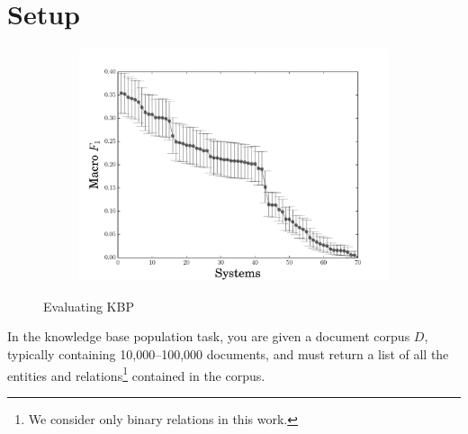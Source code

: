 \section{Setup}
\label{sec:setup}


\begin{figure}[ht]
  \centering
  \begin{subfigure}{0.49\textwidth}
  \includegraphics[width=\columnwidth]{figures/experiment1}
  \end{subfigure}
  \hfill
  \begin{subfigure}{0.49\textwidth}
  
  \end{subfigure}
  \caption{Evaluating KBP}
\end{figure}

In the knowledge base population task, 
 you are given a document corpus $D$, typically containing 10,000--100,000 documents,
 and must return a list of all the entities and relations\footnote{
 We consider only binary relations in this work.
 } contained in the corpus.

